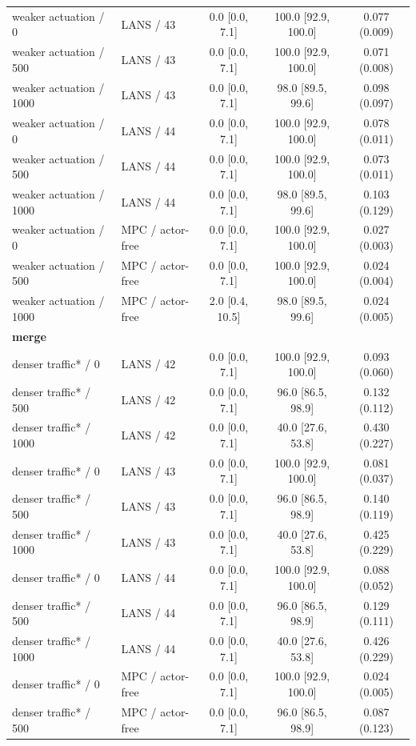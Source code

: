 \begin{longtable}{llccc}
weaker actuation / 0 & LANS / 43 & 0.0 [0.0, 7.1] & 100.0 [92.9, 100.0] & 0.077 (0.009) \\
weaker actuation / 500 & LANS / 43 & 0.0 [0.0, 7.1] & 100.0 [92.9, 100.0] & 0.071 (0.008) \\
weaker actuation / 1000 & LANS / 43 & 0.0 [0.0, 7.1] & 98.0 [89.5, 99.6] & 0.098 (0.097) \\
weaker actuation / 0 & LANS / 44 & 0.0 [0.0, 7.1] & 100.0 [92.9, 100.0] & 0.078 (0.011) \\
weaker actuation / 500 & LANS / 44 & 0.0 [0.0, 7.1] & 100.0 [92.9, 100.0] & 0.073 (0.011) \\
weaker actuation / 1000 & LANS / 44 & 0.0 [0.0, 7.1] & 98.0 [89.5, 99.6] & 0.103 (0.129) \\
weaker actuation / 0 & MPC / actor-free & 0.0 [0.0, 7.1] & 100.0 [92.9, 100.0] & 0.027 (0.003) \\
weaker actuation / 500 & MPC / actor-free & 0.0 [0.0, 7.1] & 100.0 [92.9, 100.0] & 0.024 (0.004) \\
weaker actuation / 1000 & MPC / actor-free & 2.0 [0.4, 10.5] & 98.0 [89.5, 99.6] & 0.024 (0.005) \\
\multicolumn{5}{l}{\textbf{merge}} \\
denser traffic* / 0 & LANS / 42 & 0.0 [0.0, 7.1] & 100.0 [92.9, 100.0] & 0.093 (0.060) \\
denser traffic* / 500 & LANS / 42 & 0.0 [0.0, 7.1] & 96.0 [86.5, 98.9] & 0.132 (0.112) \\
denser traffic* / 1000 & LANS / 42 & 0.0 [0.0, 7.1] & 40.0 [27.6, 53.8] & 0.430 (0.227) \\
denser traffic* / 0 & LANS / 43 & 0.0 [0.0, 7.1] & 100.0 [92.9, 100.0] & 0.081 (0.037) \\
denser traffic* / 500 & LANS / 43 & 0.0 [0.0, 7.1] & 96.0 [86.5, 98.9] & 0.140 (0.119) \\
denser traffic* / 1000 & LANS / 43 & 0.0 [0.0, 7.1] & 40.0 [27.6, 53.8] & 0.425 (0.229) \\
denser traffic* / 0 & LANS / 44 & 0.0 [0.0, 7.1] & 100.0 [92.9, 100.0] & 0.088 (0.052) \\
denser traffic* / 500 & LANS / 44 & 0.0 [0.0, 7.1] & 96.0 [86.5, 98.9] & 0.129 (0.111) \\
denser traffic* / 1000 & LANS / 44 & 0.0 [0.0, 7.1] & 40.0 [27.6, 53.8] & 0.426 (0.229) \\
denser traffic* / 0 & MPC / actor-free & 0.0 [0.0, 7.1] & 100.0 [92.9, 100.0] & 0.024 (0.005) \\
denser traffic* / 500 & MPC / actor-free & 0.0 [0.0, 7.1] & 96.0 [86.5, 98.9] & 0.087 (0.123) \\

\end{longtable}
